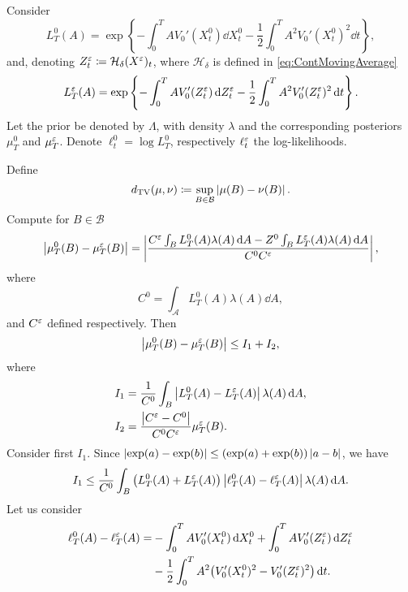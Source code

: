 \documentclass[10pt]{article}
\begin{document}
Consider 
\begin{equation}
L_T^0(A) = \exp\left\{-\int_0^T A V_0'(X_t^0) \dd X_t^0 - \frac12 \int_0^T A^2 V_0'(X_t^0)^2 \dd t \right\},
\end{equation}
and, denoting $Z^\varepsilon_t \coloneqq \mathcal H_\delta(X^\varepsilon)_t$, where $\mathcal H_\delta$ is defined in \eqref{eq:ContMovingAverage}
\begin{equation}
L_T^\varepsilon(A) = \exp\left\{-\int_0^T A V_0'(Z^\varepsilon_t)\,\mathrm{d} Z^\varepsilon_t - \frac12 \int_0^T A^2 V_0'(Z^\varepsilon_t)^2 \,\mathrm{d} t \right\}.
\end{equation}
Let the prior be denoted by $\Lambda$, with density $\lambda$ and the corresponding posteriors $\mu_T^0$ and $\mu_T^\varepsilon$. Denote $\ell_t^0 = \log L_T^0$, respectively $\ell_t^\varepsilon$ the log-likelihoods.

Define 
\begin{equation}
d_{\mathrm{TV}}(\mu, \nu) \coloneqq \sup_{B \in \mathcal B} \left\lvert\mu(B) - \nu(B)\right\rvert.
\end{equation}
Compute for $B \in \mathcal B$ 
\begin{equation}
\left\lvert\mu_T^0(B) - \mu_T^\varepsilon(B)\right\rvert = \left\lvert\frac{C^\varepsilon \int_B L_T^0(A) \lambda(A) \,\mathrm{d} A - Z^0 \int_B L_T^\varepsilon(A) \lambda(A) \,\mathrm{d} A}{C^0 C^\varepsilon}\right\rvert,
\end{equation}
where
\begin{equation}
C^0 = \int_{\mathcal A} L_T^0(A) \lambda(A) \dd A,
\end{equation}
and $C^\varepsilon$ defined respectively. Then
\begin{equation}
\left\lvert\mu_T^0(B) - \mu_T^\varepsilon(B)\right\rvert \leq I_1 + I_2, 
\end{equation}
where
\begin{equation}
\begin{aligned}
I_1 &= \frac{1}{C^0} \int_B \left\lvert L_T^0(A) - L_T^\varepsilon(A)\right\rvert \lambda(A) \,\mathrm{d} A, \\
I_2 &= \frac{\left\lvert C^\varepsilon - C^0\right\rvert}{C^0 C^\varepsilon} \mu_T^\varepsilon(B).
\end{aligned}
\end{equation}
Consider first $I_1$. Since $\left\lvert\exp(a) - \exp(b)\right\rvert \leq (\exp(a)+ \exp(b)) \left\lvert a - b\right\rvert$, we have
\begin{equation}
I_1 \leq \frac{1}{C^0} \int_B \big(L_T^0(A) + L_T^\varepsilon(A)\big)\left\lvert\ell_T^0(A) - \ell_T^\varepsilon(A)\right\rvert \lambda(A) \,\mathrm{d} A.
\end{equation}
Let us consider
\begin{equation}
\begin{aligned}
\ell_T^0(A) - \ell_T^\varepsilon(A) = &- \int_0^T A V_0'(X_t^0) \,\mathrm{d} X_t^0 + \int_0^T A V_0'(Z^\varepsilon_t) \,\mathrm{d} Z^\varepsilon_t \\
&- \frac12 \int_0^T A^2 \big(V_0'(X_t^0)^2 - V_0'(Z^\varepsilon_t)^2\big) \,\mathrm{d} t.
\end{aligned}
\end{equation}
\end{document}

